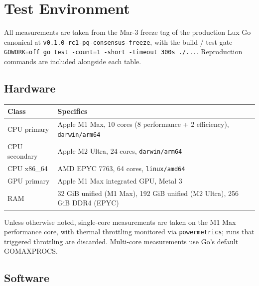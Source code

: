 \section{Test Environment}
\label{sec:test-environment}

All measurements are taken from the Mar-3 freeze tag of the production Lux Go canonical at \texttt{v0.1.0-rc1-pq-consensus-freeze}, with the build / test gate \texttt{GOWORK=off go test -count=1 -short -timeout 300s ./...}. Reproduction commands are included alongside each table.

\subsection{Hardware}

\begin{tabular}{@{}p{}p{}@{}}
  \toprule
  \textbf{Class} & \textbf{Specifics} \\
  \midrule
  CPU primary & Apple M1 Max, 10 cores (8 performance + 2 efficiency), \texttt{darwin/arm64} \\
  CPU secondary & Apple M2 Ultra, 24 cores, \texttt{darwin/arm64} \\
  CPU x86\_64 & AMD EPYC 7763, 64 cores, \texttt{linux/amd64} \\
  GPU primary & Apple M1 Max integrated GPU, Metal 3 \\
  RAM & 32 GiB unified (M1 Max), 192 GiB unified (M2 Ultra), 256 GiB DDR4 (EPYC) \\
  \bottomrule
\end{tabular}

Unless otherwise noted, single-core measurements are taken on the M1 Max performance core, with thermal throttling monitored via \texttt{powermetrics}; runs that triggered throttling are discarded. Multi-core measurements use Go's default GOMAXPROCS.

\subsection{Software}

